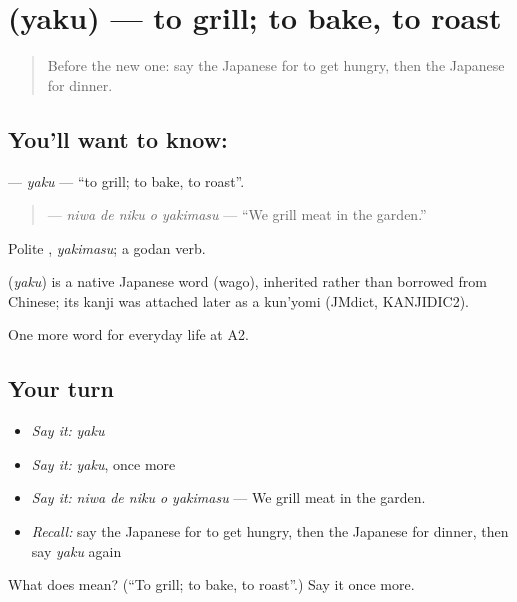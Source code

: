 \section[\texorpdfstring{\ja{やく} (yaku)}{やく (yaku)}]{ (yaku) — to grill; to bake, to roast}

\label{lesson:JA-C172-yaku}



\begin{quote}
Before the new one: say the Japanese for to get hungry, then the Japanese for dinner.
\end{quote}

\subsection*{You'll want to know: }
\textbf{} — \emph{yaku} — \textquotedblleft{}to grill; to bake, to roast\textquotedblright{}.

\begin{quote}
\textbf{  } — \emph{niwa de niku o yakimasu} — \textquotedblleft{}We grill meat in the garden.\textquotedblright{}
\end{quote}

Polite \textbf{}, \emph{yakimasu}; a godan verb.

\begin{cousinweb}
\textbf{} (\emph{yaku}) is a native Japanese word (wago), inherited rather than borrowed from Chinese; its kanji was attached later as a kun'yomi (JMdict, KANJIDIC2).
\end{cousinweb}

\begin{grammarlens}[title={What you've built}]
One more word for everyday life at A2.
\end{grammarlens}

\subsection*{Your turn}
\begin{itemize}
\raggedright
  \item \emph{Say it:} \emph{yaku}
  \item \emph{Say it:} \emph{yaku}, once more
  \item \emph{Say it:} \emph{niwa de niku o yakimasu} — We grill meat in the garden.
  \item \emph{Recall:} say the Japanese for to get hungry, then the Japanese for dinner, then say \emph{yaku} again
\end{itemize}

\begin{tcolorbox}[breakable,colback=teal!4,colframe=teal!35!black,title={Before you move on}]
What does  mean? (\textquotedblleft{}To grill; to bake, to roast\textquotedblright{}.) Say it once more.
\end{tcolorbox}
